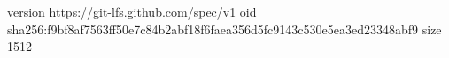 version https://git-lfs.github.com/spec/v1
oid sha256:f9bf8af7563ff50e7c84b2abf18f6faea356d5fc9143c530e5ea3ed23348abf9
size 1512
